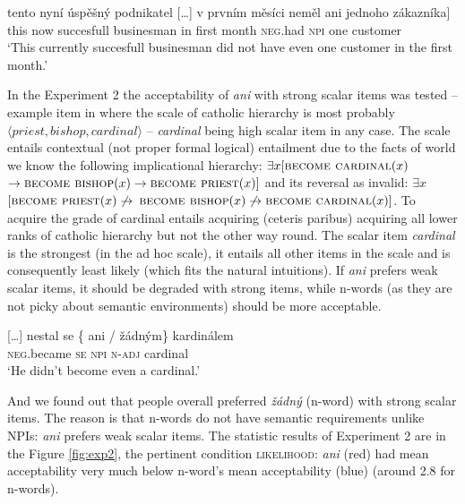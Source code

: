\documentclass[output=paper,
]{langscibook}
\begin{document}
\ea\label{ex-41} \gll tento nyní úspěšný podnikatel {[}\ldots{}{]} v prvním měsíci neměl \minsp{[} ani jednoho zákazníka]\\
this now succesfull businesman {} in first month \textsc{neg}.had {} \textsc{npi} one customer {}\\
\glt `This currently succesfull businesman did not have even one customer in the first month.'
\z

\noindent\sloppy In the Experiment 2 the acceptability of \textit{ani} with strong scalar items was tested -- example item in  where the scale of catholic hierarchy is most probably $\langle priest, bishop, cardinal\rangle$ -- \textit{cardinal} being high scalar item in any case. The scale entails contextual (not proper formal logical) entailment due to the facts of world we know the following implicational hierarchy: $\exists x[\textsc{become cardinal}(x)$ $\rightarrow \textsc{become bishop}(x) \rightarrow \textsc{become priest}(x)]$ and its reversal as invalid: $\exists x$ $[\textsc{become priest}(x) \not\rightarrow$ $\textsc{become bishop}(x) \not\rightarrow \textsc{become cardinal}(x)]$. To acquire the grade of cardinal entails acquiring (ceteris paribus) acquiring all lower ranks of catholic hierarchy but not the other way round. The scalar item \textit{cardinal} is the strongest (in the ad hoc scale), it entails all other items in the scale and is consequently least likely (which fits the natural intuitions). If \textit{ani} prefers weak scalar items, it should be degraded with strong items, while n-words (as they are not picky about semantic environments) should be more acceptable.

\ea \label{ex-42} {[{\ldots{}}]} \gll nestal se \{\hspace{-2pt} ani / žádným\} kardinálem\\
\textsc{neg.}became \textsc{se} {} \textsc{npi} {} \textsc{n-adj} cardinal\\
\glt `He didn't become even a cardinal.'
\z

\noindent And we found out that people overall preferred \textit{žádný} (n-word) with strong scalar items. The reason is that n-words do not have semantic requirements unlike NPIs: \textit{ani} prefers weak scalar items. The statistic results of Experiment 2 are in the Figure \ref{fig:exp2}, the pertinent condition \textsc{likelihood}: \textit{ani} (red) had mean acceptability very much below n-word's mean acceptability (blue) (around 2.8 for n-words).
\end{document}
